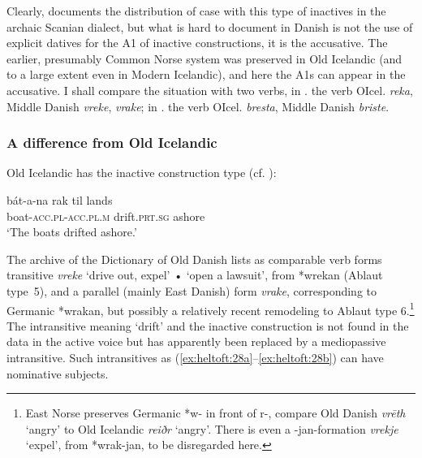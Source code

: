 \documentclass[output=paper]{langscibook}
\begin{document}
Clearly,  documents the distribution of case with this type of inactives in the archaic Scanian dialect, but what is hard to document in Danish is not the use of explicit datives for the A1 of inactive constructions, it is the accusative. The earlier, presumably Common Norse system was preserved in Old Icelandic (and to a large extent even in Modern Icelandic), and here the A1s can appear in the accusative. I shall compare the situation with two verbs, in . the verb OIcel. \textit{reka}, Middle Danish \textit{vreke}, \textit{vrake}; in . the verb OIcel. \textit{bresta}, Middle Danish \textit{briste}.

\subsubsection{A difference from Old Icelandic} \label{heltoft:2.5.1}

Old Icelandic has the inactive construction type  (cf. \citealt{Sigurðsson1989, Sigurðsson2006}):

\begin{exe}
\ex \label{ex:heltoft:27}
    \gll bát-a-na           rak         {til lands}\\
         boat-\textsc{acc.pl-acc.pl.m}   drift.\textsc{prt.sg}    ashore\\
    \glt ‘The boats drifted ashore.'
\end{exe}

The archive of the Dictionary of Old Danish lists as comparable verb forms transitive \textit{vreke} ‘drive out, expel' • ‘open a lawsuit', from *wrekan (Ablaut type~5), and a parallel (mainly East Danish) form \textit{vrake}, corresponding to Germanic *wra\-kan, but possibly a relatively recent remodeling to Ablaut type 6.\footnote{East Norse preserves Germanic *w- in front of r-, compare Old Danish \textit{vrēth} ‘angry' to Old Icelandic \textit{reiðr} ‘angry'. There is even a -jan-formation \textit{vrekje} ‘expel', from *wrak-jan, to be disregarded here.}  The intransitive meaning ‘drift' and the inactive construction is not found in the data in the active voice but has apparently been replaced by a mediopassive intransitive. Such intransitives as (\ref{ex:heltoft:28a}--\ref{ex:heltoft:28b}) can have nominative subjects.
\end{document}
